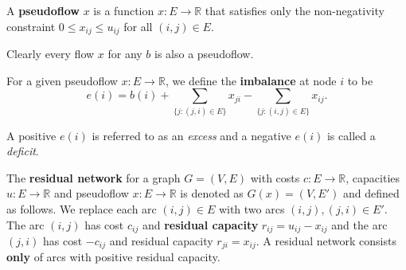 \begin{defn}
A \textbf{pseudoflow} $x$ is a function $x\colon E \rightarrow \mathbb{R}$ that satisfies only the non-negativity constraint $0 \leq x_{ij} \leq u_{ij}$ for all ${(i,j)\in E}$.
\end{defn}

Clearly every flow $x$ for any $b$ is also a pseudoflow.

\begin{defn}\label{def:imbalance}
For a given pseudoflow $x \colon E\to \mathbb{R}$, we define the \textbf{imbalance} at node $i$ to be
\[
e(i) = b(i) + \sum_{\{j\colon(j,i)\in E\}} x_{ji} - \sum_{\{j\colon(i,j)\in E\}} x_{ij}.\]
\end{defn}
A positive $e(i)$ is referred to as an \textit{excess} and a negative $e(i)$ is called a \textit{deficit}.

\begin{defn}\label{def:residual}
The \textbf{residual network} for a graph $G=(V,E)$ with costs $c\colon E \to \mathbb{R}$, capacities $u\colon E\to \mathbb{R}$ and pseudoflow $x\colon E \to \mathbb{R}$ is denoted as $G(x) = (V, E')$ and defined as follows. We replace each arc $(i,j) \in E$ with two arcs $(i,j),(j,i)\in E'$. The arc $(i,j)$ has cost $c_{ij}$ and \textbf{residual capacity} $r_{ij} = u_{ij} - x_{ij}$ and the arc $(j,i)$ has cost $-c_{ij}$ and residual capacity $r_{ji} = x_{ij}$. A residual network consists \textbf{only} of arcs with positive residual capacity.
\end{defn}